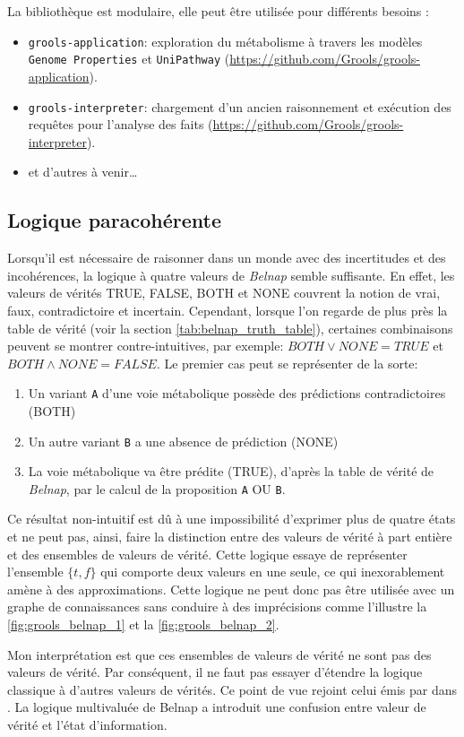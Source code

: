 \begin{refsegment}
La bibliothèque est modulaire, elle peut être utilisée pour différents besoins :\nolisttopbreak
\begin{itemize}
	\item \texttt{grools-application}: exploration du métabolisme à travers les modèles \texttt{Genome Properties} et \texttt{UniPathway}  (\url{https://github.com/Grools/grools-application}).
	\item \texttt{grools-interpreter}: chargement d'un ancien raisonnement et exécution des requêtes pour l'analyse des faits (\url{https://github.com/Grools/grools-interpreter}).
	\item et d'autres à venir\ldots
\end{itemize}

\subsection{Logique paracohérente}
Lorsqu'il est nécessaire de raisonner dans un monde avec des incertitudes et des incohérences, la logique à quatre valeurs de \textit{Belnap} semble suffisante. En effet, les valeurs de vérités TRUE, FALSE, BOTH et NONE couvrent la notion de vrai, faux, contradictoire et incertain. Cependant, lorsque l'on regarde de plus près la table de vérité  (voir la section   \cref{tab:belnap_truth_table}), certaines combinaisons peuvent se montrer contre-intuitives, par exemple: $ BOTH \lor  NONE = TRUE$ et $ BOTH \land NONE = FALSE$. Le premier cas  peut se représenter de la sorte: 
\begin{enumerate}
    \item Un variant \texttt{A} d'une voie métabolique possède des prédictions contradictoires (BOTH)
    \item Un autre variant \texttt{B} a une absence de prédiction (NONE)
    \item La voie métabolique va être prédite (TRUE), d'après la table de vérité de \textit{Belnap}, par le calcul de la proposition \texttt{A} OU \texttt{B}.
\end{enumerate}
Ce résultat non-intuitif est dû à une impossibilité d'exprimer plus de quatre états et ne peut pas, ainsi, faire la distinction entre des valeurs de vérité à part entière et des ensembles de valeurs de vérité. Cette logique essaye de représenter l'ensemble $\{t,f\}$ qui comporte deux valeurs en une seule, ce qui inexorablement amène à des approximations. Cette logique ne peut donc pas être utilisée avec un graphe de connaissances sans conduire à des  imprécisions comme l'illustre la \cref{fig:grools_belnap_1} et la  \cref{fig:grools_belnap_2}. 

Mon interprétation est que ces ensembles de valeurs de vérité ne sont pas des valeurs de vérité. Par conséquent, il ne faut pas essayer d'étendre la logique classique à d'autres valeurs de vérités. Ce point de vue rejoint celui émis par \citeauthor{dubois2008ignorance} dans \cite{dubois2008ignorance}. La logique multivaluée de Belnap a introduit une confusion entre valeur de vérité et l'état d'information.


\end{refsegment}
